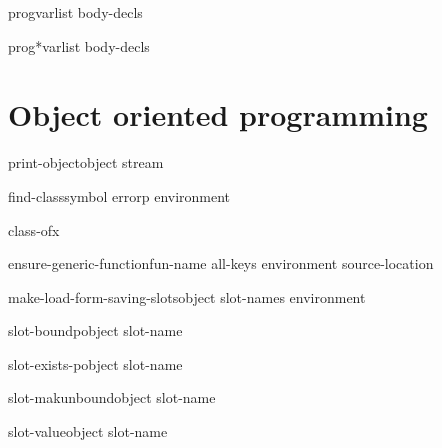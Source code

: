 \documentclass[10pt,english]{book}
\begin{document}
\begin{macro}{prog}{varlist \body body-decls}
  
\end{macro}

\begin{macro}{prog*}{varlist \body body-decls}
  
\end{macro}


\chapter{Object oriented programming}

\begin{generic}{print-object}{object stream}
  
\end{generic}

\begin{accessor}{find-class}{symbol \op errorp environment}
  
\end{accessor}

\begin{function}{class-of}{x}
  
\end{function}

\begin{function}{ensure-generic-function}{fun-name \rest all-keys \key environment source-location \akeys}
  
\end{function}

\begin{function}{make-load-form-saving-slots}{object \key slot-names environment}
  
\end{function}

\begin{function}{slot-boundp}{object slot-name}
  
\end{function}

\begin{function}{slot-exists-p}{object slot-name}
  
\end{function}

\begin{function}{slot-makunbound}{object slot-name}
  
\end{function}

\begin{function}{slot-value}{object slot-name}
  
\end{function}
\end{document}
